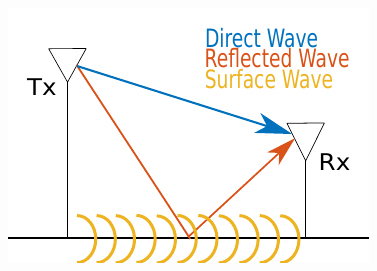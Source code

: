 \documentclass[a0paper,landscape]{baposter}
\begin{document}
\begin{poster}
{\includegraphics[scale=1]{pix/poster_cropped.pdf}
\label{fig:name}



}


\end{poster}
\end{document}
